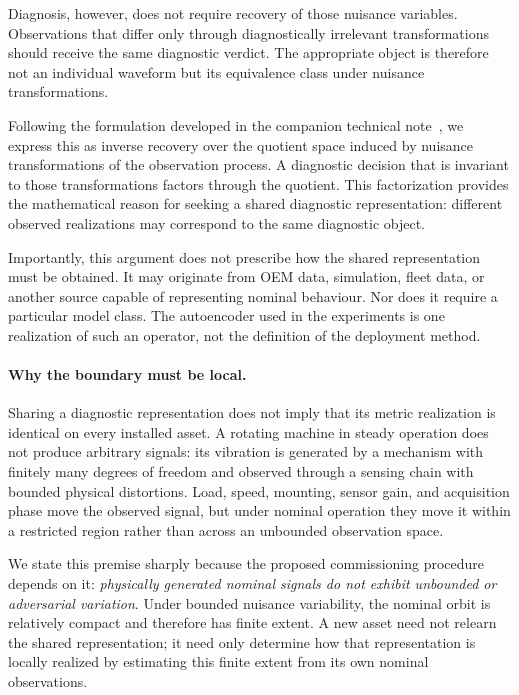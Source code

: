 \documentclass[a4paper]{cas-sc}
\begin{document}
Diagnosis, however, does not require recovery of those nuisance variables.
Observations that differ only through diagnostically irrelevant transformations
should receive the same diagnostic verdict. The appropriate object is therefore
not an individual waveform but its equivalence class under nuisance
transformations.

Following the formulation developed in the companion technical
note~\citep{disanti2026quotient}, we express this as inverse recovery over the
quotient space induced by nuisance transformations of the observation process.
A diagnostic decision that is invariant to those transformations factors
through the quotient. This factorization provides the mathematical reason for
seeking a shared diagnostic representation: different observed realizations
may correspond to the same diagnostic object.

Importantly, this argument does not prescribe how the shared representation
must be obtained. It may originate from OEM data, simulation, fleet data, or
another source capable of representing nominal behaviour. Nor does it require
a particular model class. The autoencoder used in the experiments is one
realization of such an operator, not the definition of the deployment method.

\paragraph{Why the boundary must be local.}
Sharing a diagnostic representation does not imply that its metric realization
is identical on every installed asset. A rotating machine in steady operation
does not produce arbitrary signals: its vibration is generated by a mechanism
with finitely many degrees of freedom and observed through a sensing chain with
bounded physical distortions. Load, speed, mounting, sensor gain, and
acquisition phase move the observed signal, but under nominal operation they
move it within a restricted region rather than across an unbounded observation
space.

We state this premise sharply because the proposed commissioning procedure
depends on it: \emph{physically generated nominal signals do not exhibit
unbounded or adversarial variation}. Under bounded nuisance variability, the
nominal orbit is relatively compact and therefore has finite extent. A new
asset need not relearn the shared representation; it need only determine how
that representation is locally realized by estimating this finite extent from
its own nominal observations.
\end{document}

